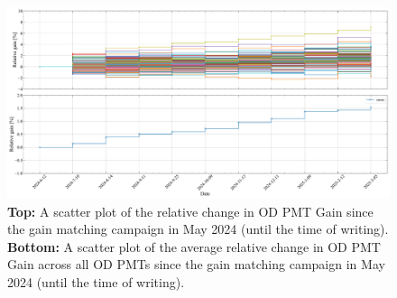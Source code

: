 \begin{figure}
    \centering
    \includegraphics[width=\textwidth]{figures/ODCommissioning/RelativegainOverTime_AllPMTs_Both_Full_WS2024May2024Onwards.pdf}
    \caption{\textbf{Top:} A scatter plot of the relative change in OD PMT Gain since the gain matching campaign in May 2024 (until the time of writing). \textbf{Bottom:} A scatter plot of the average relative change in OD PMT Gain across all OD PMTs since the gain matching campaign in May 2024 (until the time of writing).}
    \label{fig:RelativeGain_WS2024May2024Onwards}
\end{figure}

